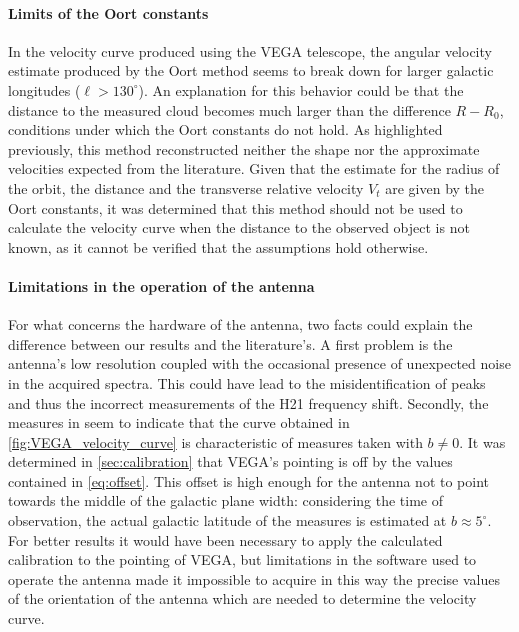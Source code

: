 \paragraph{Limits of the Oort constants}
In the velocity curve produced using the VEGA telescope, the angular velocity estimate produced by the Oort method seems to break down for larger galactic longitudes ($\ell > 130^\circ$). An explanation for this behavior could be that the distance to the measured cloud becomes much larger than the difference $R-R_0$, conditions under which the Oort constants do not hold.
As highlighted previously, this method reconstructed neither the shape nor the approximate velocities expected from the literature.
Given that the estimate for the radius of the orbit, the distance and the transverse relative velocity $V_t$ are given by the Oort constants, it was determined that this method should not be used to calculate the velocity curve when the distance to the observed object is not known, as it cannot be verified that the assumptions hold otherwise.

\paragraph{Limitations in the operation of the antenna}
For what concerns the hardware of the antenna, two facts could explain the difference between our results and the literature's. 
A first problem is the antenna's low resolution coupled with the occasional presence of unexpected noise in the acquired spectra. This could have lead to the misidentification of peaks and thus the incorrect measurements of the H21 frequency shift. 
Secondly, the measures in \cite{sakhawat_hossain_salsa_2018} seem to indicate that the curve obtained in \autoref{fig:VEGA_velocity_curve} is characteristic of measures taken with $b \neq 0$. 
It was determined in \autoref{sec:calibration} that VEGA's pointing is off by the values contained in \autoref{eq:offset}.
This offset is high enough for the antenna not to point towards the middle of the galactic plane width: considering the time of observation, the actual galactic latitude of the measures is estimated at $b \approx 5^{\circ}$.
For better results it would have been necessary to apply the calculated calibration to the pointing of VEGA, but limitations in the software used to operate the antenna made it impossible to acquire in this way the precise values of the orientation of the antenna which are needed to determine the velocity curve.


